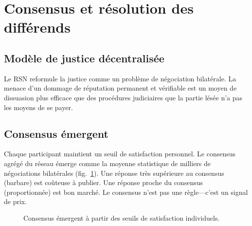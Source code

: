 \documentclass[11pt,a4paper,twocolumn]{article}
\begin{document}
\section{Consensus et résolution des différends}

\subsection{Modèle de justice décentralisée}

Le RSN reformule la justice comme un problème de négociation bilatérale. La menace d'un dommage de réputation permanent et vérifiable est un moyen de dissuasion plus efficace que des procédures judiciaires que la partie lésée n'a pas les moyens de se payer.

\subsection{Consensus émergent}

Chaque participant maintient un seuil de satisfaction personnel. Le consensus agrégé du réseau émerge comme la moyenne statistique de milliers de négociations bilatérales (fig.~\ref{fig:consensus}). Une réponse très supérieure au consensus (barbare) est coûteuse à publier. Une réponse proche du consensus (proportionnée) est bon marché. Le consensus n'est pas une règle---c'est un signal de prix.

\begin{figure}[ht]
\centering
{}
\caption{Consensus émergent à partir des seuils de satisfaction individuels.}
\label{fig:consensus}
\end{figure}
\end{document}
